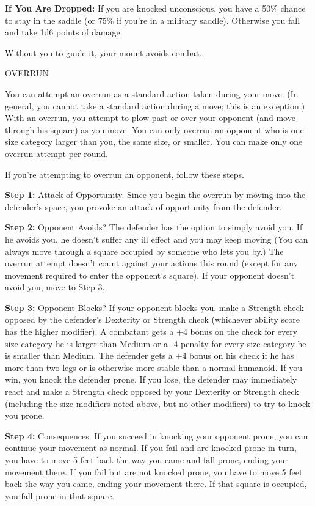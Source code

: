 \documentclass{article}
\begin{document}
\textbf{If You Are Dropped:} If you are knocked unconscious, you have a 50\% chance 
to stay in the saddle (or 75\% if you're in a military saddle). Otherwise you fall 
and take 1d6 points of damage.

Without you to guide it, your mount avoids combat.

\vspace{12pt}
OVERRUN

You can attempt an overrun as a standard action taken during your move. (In general, 
you cannot take a standard action during a move; this is an exception.) With an 
overrun, you attempt to plow past or over your opponent (and move through his square) 
as you move. You can only overrun an opponent who is one size category larger than 
you, the same size, or smaller. You can make only one overrun attempt per round.

If you're attempting to overrun an opponent, follow these steps.

\textbf{Step 1:} Attack of Opportunity. Since you begin the overrun by moving into 
the defender's space, you provoke an attack of opportunity from the defender.

\textbf{Step 2: }Opponent Avoids? The defender has the option to simply avoid you. 
If he avoids you, he doesn't suffer any ill effect and you may keep moving (You 
can always move through a square occupied by someone who lets you by.) The overrun 
attempt doesn't count against your actions this round (except for any movement 
required to enter the opponent's square). If your opponent doesn't avoid you, move 
to Step 3.

\textbf{Step 3:} Opponent Blocks? If your opponent blocks you, make a Strength 
check opposed by the defender's Dexterity or Strength check (whichever ability 
score has the higher modifier). A combatant gets a +4 bonus on the check for every 
size category he is larger than Medium or a -4 penalty for every size category 
he is smaller than Medium. The defender gets a +4 bonus on his check if he has 
more than two legs or is otherwise more stable than a normal humanoid. If you win, 
you knock the defender prone. If you lose, the defender may immediately react and 
make a Strength check opposed by your Dexterity or Strength check (including the 
size modifiers noted above, but no other modifiers) to try to knock you prone.

\textbf{Step 4: }Consequences. If you succeed in knocking your opponent prone, 
you can continue your movement as normal. If you fail and are knocked prone in 
turn, you have to move 5 feet back the way you came and fall prone, ending your 
movement there. If you fail but are not knocked prone, you have to move 5 feet 
back the way you came, ending your movement there. If that square is occupied, 
you fall prone in that square.
\end{document}
